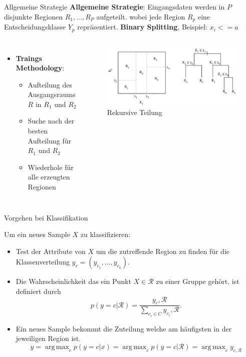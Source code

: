 \documentclass{beamer}
\DeclareMathOperator*{\argmax}{arg\,max}
\begin{document}
\begin{frame}{Allgemeine Strategie}
	\textbf{Allgemeine Strategie}: Eingangsdaten werden in $P$ disjunkte Regionen $R_1,\dots,R_P$ aufgeteilt. 
	wobei jede Region $R_p$ eine Entscheidungsklasse $Y_p$ repräsentiert. 
 \textbf{Binary Splitting}, Beispiel: $x_i <= a$
	
	\begin{columns}
 			\begin{itemize}
				\item{\textbf{Traings Methodology}:}
				\begin{itemize}
					\item {Aufteilung des Ausgangsraums $R$ in $R_1$ und $R_2$}
					\item{Suche nach der besten Aufteilung für $R_1$ und $R_2$}
					\item{Wiederhole für alle erzeugten Regionen}
				\end{itemize}
			\end{itemize}
			
			\begin{figure}
				\includegraphics[width=\linewidth]{Images/split.png}
				\caption{Rekursive Teilung \cite{hastie_tibshirani_friedman}}
			\end{figure}
	\end{columns}
\end{frame}



\begin{frame}{Vorgehen bei Klassifikation}

Um ein neues Sample $X$ zu klassifizieren:
	\begin{itemize}
		\item Test der Attribute von $X$ um die zutreffende Region zu finden für die Klassenverteilung $y_r = (y_{c_1}, \ldots, y_{c_k})$.
		\item Die Wahrscheinlichkeit das ein Punkt $X \in \mathcal{R}$ zu einer Gruppe gehört, ist definiert durch
			\[p(y = c | \mathcal{R}) = \frac{y_c, \mathcal{R}}{\sum_{c_i \in C} y_{c_i}, \mathcal{R}}.\]
		\item Ein neues Sample bekommt die Zuteilung welche am häufigsten in der jeweiligen Region ist.
			\[\hat{y} = \argmax_c p(y = c | x) = \argmax_c p(y = c | \mathcal{R}) = \argmax_c y_{c,\mathcal{R}}\]
	\end{itemize}
\end{frame}
\end{document}
